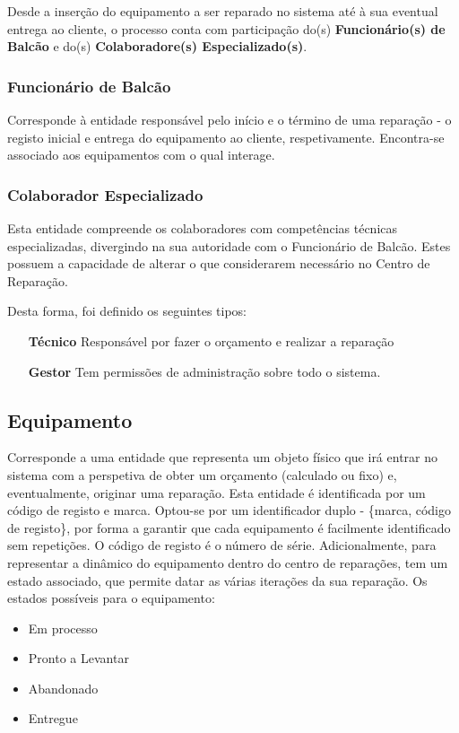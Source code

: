 \documentclass[a4paper,12pt]{scrreprt}
\begin{document}
Desde a inserção do equipamento a ser reparado no sistema até à sua eventual entrega ao cliente, o processo conta com participação
do(s) \textbf{Funcionário(s) de Balcão} e do(s) \textbf{Colaboradore(s) Especializado(s)}.

\subsubsection{Funcionário de Balcão} \label{ent_func_balcao}
Corresponde à entidade responsável pelo início e o término de uma reparação - o registo inicial e entrega do equipamento ao cliente, respetivamente.
Encontra-se associado aos equipamentos com o qual interage.

\subsubsection{Colaborador Especializado} \label{ent_colab_especializado}
Esta entidade compreende os colaboradores com competências técnicas especializadas, divergindo na sua autoridade com o Funcionário de Balcão. 
Estes possuem a capacidade de alterar o que considerarem necessário no Centro de Reparação.

Desta forma, foi definido os seguintes tipos:
\begin{itemize}
    \item[\textbf{Técnico}]{Responsável por fazer o orçamento e realizar a reparação}
    \item[\textbf{Gestor}]{Tem permissões de administração sobre todo o sistema.}
\end{itemize}

\subsection{Equipamento} \label{ent_equipamento}
Corresponde a uma entidade que representa um objeto físico que irá entrar no sistema com a perspetiva de obter um orçamento (calculado ou fixo) e,
eventualmente, originar uma reparação.
Esta entidade é identificada por um código de registo e marca.
Optou-se por um identificador duplo - \{marca, código de registo\}, 
por forma a garantir que cada equipamento é facilmente identificado sem repetições.
O código de registo é o número de série.
Adicionalmente, para representar a dinâmico do equipamento dentro do centro de reparações, tem um estado associado, que permite datar as várias 
iterações da sua reparação.
Os estados possíveis para o equipamento:
\begin{itemize}
    \item Em processo
    \item Pronto a Levantar
    \item Abandonado
    \item Entregue
\end{itemize}
\end{document}
